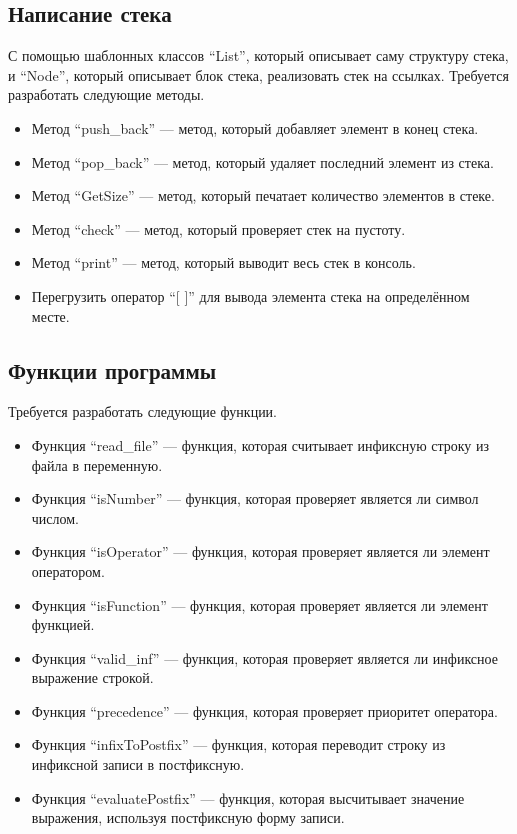 \documentclass[12pt, a4paper]{article}
\begin{document}
\subsection{Написание стека}
С помощью шаблонных классов ``List'', который описывает саму структуру стека, и ``Node'', который описывает блок стека, реализовать стек на ссылках. Требуется разработать следующие методы.
\begin{itemize}
    \item[---] Метод ``push\_back'' --- метод, который добавляет элемент в конец стека.
    \item[---] Метод ``pop\_back'' --- метод, который удаляет последний элемент из стека.
    \item[---] Метод ``GetSize'' --- метод, который печатает количество элементов в стеке.
    \item[---] Метод ``check'' --- метод, который проверяет стек на пустоту.
    \item[---] Метод ``print'' --- метод, который выводит весь стек в консоль.
    \item[---] Перегрузить оператор ``[ ]'' для вывода элемента стека на определённом месте.
\end{itemize}

\subsection{Функции программы}
Требуется разработать следующие функции.
\begin{itemize}
    \item[---] Функция ``read\_file'' --- функция, которая считывает инфиксную строку из файла в переменную.
    \item[---] Функция ``isNumber'' --- функция, которая проверяет является ли символ числом.
    \item[---] Функция ``isOperator'' --- функция, которая проверяет является ли элемент оператором.
    \item[---] Функция ``isFunction'' --- функция, которая проверяет является ли элемент функцией.
    \item[---] Функция ``valid\_inf'' --- функция, которая проверяет является ли инфиксное выражение строкой.
    \item[---] Функция ``precedence'' --- функция, которая проверяет приоритет оператора.
    \item[---] Функция ``infixToPostfix'' --- функция, которая переводит строку из инфиксной записи в постфиксную.
    \item[---] Функция ``evaluatePostfix'' --- функция, которая высчитывает значение выражения, используя постфиксную форму записи.
\end{itemize}
\end{document}
